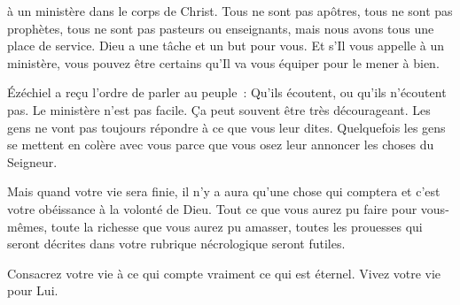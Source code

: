 

 à un ministère
 dans le corps de Christ. Tous ne sont pas apôtres,
 tous ne sont pas prophètes, tous ne sont pas pasteurs ou enseignants,
 mais nous avons tous une place de service.
 Dieu a une tâche et un but pour vous.
 Et s'Il vous appelle à un ministère, vous pouvez être certains
 qu'Il va vous équiper pour le mener à bien. 


Ézéchiel a reçu l'ordre de parler au peuple~: 
 \og Qu'ils écoutent, ou qu'ils n'écoutent pas. \fg{}
 Le ministère n'est pas facile. Ça peut souvent être très décourageant.
 Les gens ne vont pas toujours répondre à ce que vous leur dites.
 Quelquefois les gens se mettent en colère avec vous parce que vous osez
 leur annoncer les choses du Seigneur. 

Mais quand votre vie sera finie, il n'y a aura qu'une chose qui comptera 
 \ocadr et c'est votre obéissance à la volonté de Dieu.
 Tout ce que vous aurez pu faire pour vous-mêmes, toute la richesse
 que vous aurez pu amasser, toutes les prouesses qui seront décrites
 dans votre rubrique nécrologique seront futiles. 

Consacrez votre vie à ce qui compte vraiment
 \ocadr ce qui est éternel. Vivez votre vie pour Lui. 

\dvrule






